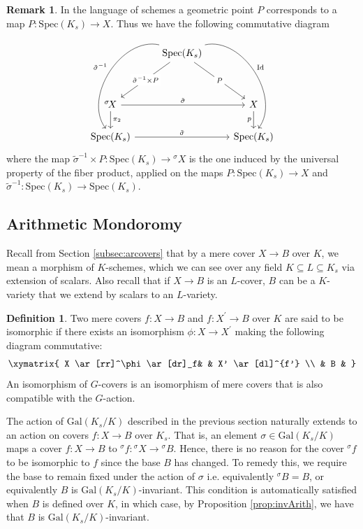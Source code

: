 \documentclass[10pt]{amsart}
\theoremstyle{definition}
\newtheorem{remark}[theorem]{Remark}
\newtheorem{definition}[theorem]{Definition}
\newcommand{\Spe}{ {\mathrm{Spec} } }
\newcommand{\Gal}{{ \mathrm{Gal}}}
\begin{document}
\begin{remark}{\label{rem:schemeaction}}
In the language of schemes a geometric point $P$ corresponds to a map $P \colon \Spe(K_s) \rightarrow X$. Thus we have the following commutative diagram
\begin{equation*} \label{eq:schematicpt }
\begin{tikzcd}
	&   \Spe(K_s) \arrow[ddl, "\tilde{\sigma}^{-1} \times P" description] \arrow[ddr, "P" description] \arrow[dddl, bend right = 70, "\tilde{\sigma}^{-1}"'] \arrow[dddr, bend left = 70, "\mathrm{Id}"] \\
	\\
	{^\sigma \! X} \arrow[d, "\pi_2"] \arrow[rr, "\tilde{\sigma}"] & & X \arrow[d, "p"'] \\
	\Spe(K_s) \arrow[rr, "\tilde{\sigma}"] & & \Spe(K_s)
\end{tikzcd}
\end{equation*}
where the map $\tilde{\sigma}^{-1} \times P \colon \Spe(K_s) \rightarrow  {^\sigma \! X }$ is the one induced by the universal property of the fiber product, applied on the maps $P\colon \Spe(K_s)\rightarrow X$ and $\tilde{\sigma}^{-1} \colon \Spe(K_s)\rightarrow \Spe(K_s)$.
\end{remark}


\subsection{Arithmetic Mondoromy}
Recall from Section \ref{subsec:arcovers} that by a mere cover $X\! \rightarrow\!B$ over $K$, we mean a morphism of $K$-schemes, which we can see over any field $K\subseteq L\subseteq K_s$ via extension of scalars. Also recall that if $X \to B$ is an $L$-cover, $B$ can be a $K$-variety that we extend by scalars to an $L$-variety.

\begin{definition}
Two mere covers $f \colon X \to B$ and $f \colon X^\prime \to B$ over $K$ are said to be isomorphic if there exists an isomorphism $\phi \colon X \to X^\prime$ making the following diagram commutative:
\[
  \xymatrix{
  X \ar[rr]^\phi \ar[dr]_f& & X' \ar[dl]^{f'}
  \\
  & B & 
  }
\]
An isomorphism of $G$-covers is an isomorphism of mere covers that is also compatible with the $G$-action.     
\end{definition}

The action of $\Gal(K_s / K)$ described in the previous section naturally extends to an action on covers $f \colon X \to B$ over $K_s$. That is, an element $\sigma \in \Gal(K_s/K) $ maps a cover $f \colon X \to B$ to $^\sigma \! f \colon  {^\sigma \! X} \to { ^\sigma\! B}$. Hence, there is no reason for the cover ${^\sigma \! f}$ to be isomorphic to $f$ since the base $B$ has changed. To remedy this, we require the base to remain fixed under the action of $\sigma$ i.e. equivalently $^\sigma \! B = B$, or equivalently $B$ is $\Gal(K_s/K)$-invariant. This condition is automatically satisfied when $B$ is defined over $K$, in which case, by Proposition \ref{prop:invArith}, we have that $B$ is $\Gal(K_s / K)$-invariant. 
\end{document}
